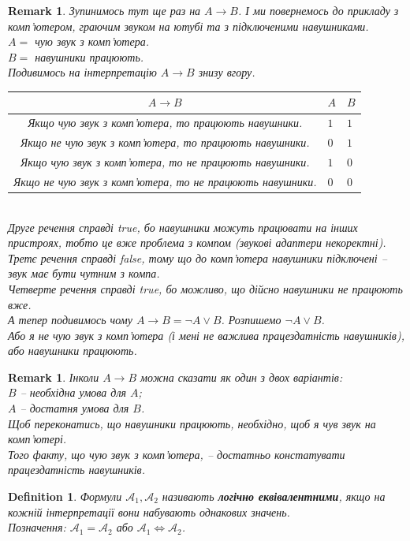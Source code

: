 \documentclass[a4paper, 14pt]{extarticle}
\theoremstyle{theoremdd}
\theoremstyle{theoremdd}
\newtheorem{definition}[theorem]{Definition}
\theoremstyle{theoremdd}
\theoremstyle{theoremdd}
\theoremstyle{theoremdd}
\theoremstyle{theoremdd}
\theoremstyle{theoremdd}
\theoremstyle{theoremdd}
\theoremstyle{theoremdd}
\theoremstyle{theoremdd}
\theoremstyle{theoremdd}
\newtheorem{remark}[theorem]{Remark}
\theoremstyle{theoremdd}
\theoremstyle{theoremdd}
\theoremstyle{theoremdd}
\theoremstyle{theoremdd}
\begin{document}
\begin{remark}
Зупинимось тут ще раз на $A \rightarrow B$. І ми повернемось до прикладу з комп'ютером, граючим звуком на ютубі та з підключеними навушниками.\\
$A = $ чую звук з комп'ютера.\\
$B = $ навушники працюють.\\
Подивимось на інтерпретацію $A \rightarrow B$ знизу вгору.\\
\begin{tabular}{c|l|l}
$A \rightarrow B$ & $A$ & $B$ \\
\hline
Якщо чую звук з комп'ютера, то працюють навушники. & $1$ & $1$\\
Якщо не чую звук з комп'ютера, то працюють навушники. & $0$ & $1$\\
Якщо чую звук з комп'ютера, то не працюють навушники. & $1$ & $0$\\
Якщо не чую звук з комп'ютера, то не працюють навушники. & $0$ & $0$
\end{tabular}
\bigskip \\
Друге речення справді true, бо навушники можуть працювати на інших пристроях, тобто це вже проблема з компом (звукові адаптери некоректні).\\
Третє речення справді false, тому що до комп'ютера навушники підключені -- звук має бути чутним з компа.\\
Четверте речення справді true, бо можливо, що дійсно навушники не працюють вже.
\bigskip \\
А тепер подивимось чому $A \rightarrow B = \neg A \vee B$. Розпишемо $\neg A \vee B$.\\
Або я не чую звук з комп'ютера (і мені не важлива працездатність навушників), або навушники працюють.
\end{remark}

\begin{remark}
Інколи $A \rightarrow B$ можна сказати як один з двох варіантів:\\
$B$ -- необхідна умова для $A$;\\
$A$ -- достатня умова для $B$.\\
Щоб переконатись, що навушники працюють, необхідно, щоб я чув звук на комп'ютері.\\
Того факту, що чую звук з комп'ютера, -- достатньо констатувати працездатність навушників.
\end{remark}

\begin{definition}
Формули $\mathcal{A}_1, \mathcal{A}_2$ називають \textbf{логічно еквівалентними}, якщо на кожній інтерпретації вони набувають однакових значень.\\
Позначення: $\mathcal{A}_1 = \mathcal{A}_2$ або $\mathcal{A}_1 \Leftrightarrow \mathcal{A}_2$.
\end{definition}
\end{document}
